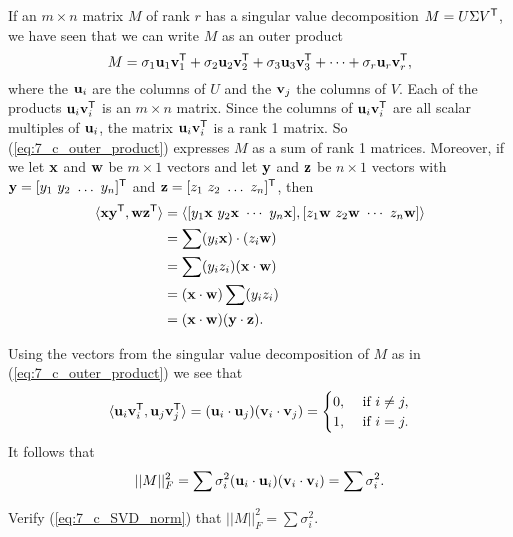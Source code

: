 If an $m \times n$ matrix $M$ of rank $r$ has a singular value decomposition $M = U \Sigma V^{\mathsf{T}}$, we have seen that we can write $M$ as an outer product
\begin{equation}
M = \sigma_1 \mathbf{u}_1\mathbf{v}_1^{\mathsf{T}} + \sigma_2 \mathbf{u}_2\mathbf{v}_2^{\mathsf{T}} + \sigma_3 \mathbf{u}_3\mathbf{v}_3^{\mathsf{T}} + \cdots + \sigma_{r} \mathbf{u}_{r}\mathbf{v}_{r}^{\mathsf{T}}, \label{eq:7_c_outer_product}
\end{equation}
where the $\mathbf{u}_i$ are the columns of $U$ and the $\mathbf{v}_j$ the columns of $V$. Each of the products $\mathbf{u}_i \mathbf{v}_i^{\mathsf{T}}$ is an $m \times n$ matrix. Since the columns of $\mathbf{u}_i \mathbf{v}_i^{\mathsf{T}}$ are all scalar multiples of $\mathbf{u}_i$, the matrix $\mathbf{u}_i \mathbf{v}_i^{\mathsf{T}}$ is a rank 1 matrix. So (\ref{eq:7_c_outer_product}) expresses $M$ as a sum of rank 1 matrices. Moreover, if we let $\mathbf{x}$ and $\mathbf{w}$ be $m \times 1$ vectors and let $\mathbf{y}$ and $\mathbf{z}$ be $n \times 1$ vectors with $\vy = [y_1 \ y_2 \ \ldots \ y_n]^{\tr}$ and $\vz = [z_1 \ z_2 \ \ldots \ z_n]^{\tr}$, then
\begin{align*}
\langle \vx\vy^{\tr}, \vw\vz^{\tr} \rangle &= \langle [y_1\vx \ y_2\vx \ \cdots \ y_n\vx], [z_1\vw \ z_2\vw \ \cdots \ z_n\vw] \rangle \\
	&= \sum (y_i\vx) \cdot (z_i\vw) \\
	&= \sum (y_iz_i)(\vx \cdot \vw) \\
	&= (\vx \cdot \vw) \sum (y_iz_i) \\
	&= (\vx \cdot \vw) (\vy \cdot \vz).
\end{align*}

Using the vectors from the singular value decomposition of $M$ as in (\ref{eq:7_c_outer_product}) we see that
\[\langle \mathbf{u}_i\mathbf{v}_i^{\mathsf{T}}, \mathbf{u}_j\mathbf{v}_j^{\mathsf{T}} \rangle = (\mathbf{u}_i \cdot \mathbf{u}_j)(\mathbf{v}_i \cdot \mathbf{v}_j) = \begin{cases}
0, &\text{ if } i\neq j, \\
1, &\text{ if } i = j.
\end{cases}\]
It follows that
\begin{equation}
||M||_F^2 = \sum \sigma_i^2 (\mathbf{u}_i \cdot \mathbf{u}_i)(\mathbf{v}_i \cdot \mathbf{v}_i) = \sum \sigma_i^2. \label{eq:7_c_SVD_norm}
\end{equation}



\begin{activity} Verify (\ref{eq:7_c_SVD_norm}) that $||M||_F^2 = \sum \sigma_i^2$.



\end{activity}


